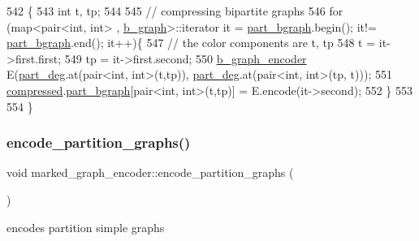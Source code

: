 \begin{DoxyCode}
542 \{
543   \textcolor{keywordtype}{int} t, tp;
544 
545   \textcolor{comment}{// compressing bipartite graphs }
546   \textcolor{keywordflow}{for} (map<pair<int, int> , \hyperlink{classb__graph}{b\_graph}>::iterator it = \hyperlink{classmarked__graph__encoder_a5faebef707fb681c0b6c2ccf64abc04c}{part\_bgraph}.begin(); it!=
      \hyperlink{classmarked__graph__encoder_a5faebef707fb681c0b6c2ccf64abc04c}{part\_bgraph}.end(); it++)\{
547     \textcolor{comment}{// the color components are t, tp}
548     t = it->first.first; 
549     tp = it->first.second; 
550     \hyperlink{classb__graph__encoder}{b\_graph\_encoder} E(\hyperlink{classmarked__graph__encoder_a55ea2edb2609dfc287432f61900d6ad1}{part\_deg}.at(pair<int, int>(t,tp)),
      \hyperlink{classmarked__graph__encoder_a55ea2edb2609dfc287432f61900d6ad1}{part\_deg}.at(pair<int, int>(tp, t)));
551     \hyperlink{classmarked__graph__encoder_ac2ded200860fdd2321f86dd76b28bcb3}{compressed}.\hyperlink{classmarked__graph__compressed_a7b3267063fba30b45eb21b3ba4e07536}{part\_bgraph}[pair<int, int>(t,tp)] = E.encode(it->second);
552   \}
553 
554 \}
\end{DoxyCode}
\mbox{\label{classmarked__graph__encoder_a654463d4b256b84225f5944b5e361ebf}} 
\subsubsection{\texorpdfstring{encode\+\_\+partition\+\_\+graphs()}{encode\_partition\_graphs()}}
{\footnotesize\ttfamily void marked\+\_\+graph\+\_\+encoder\+::encode\+\_\+partition\+\_\+graphs (\begin{DoxyParamCaption}{ }\end{DoxyParamCaption})\hspace{0.3cm}{\ttfamily [private]}}



encodes partition simple graphs 


